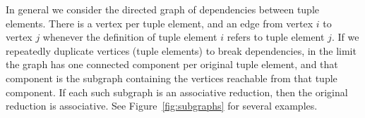 In general we consider the directed graph of dependencies between tuple elements. There is a vertex per tuple element, and an edge from vertex $i$ to vertex $j$ whenever the definition of tuple element $i$ refers to tuple element $j$. If we repeatedly duplicate vertices (tuple elements) to break dependencies, in the limit the graph has one connected component per original tuple element, and that component is the subgraph containing the vertices reachable from that tuple component. If each such subgraph is an associative reduction, then the original reduction is associative. See Figure~\ref{fig:subgraphs} for several examples.




